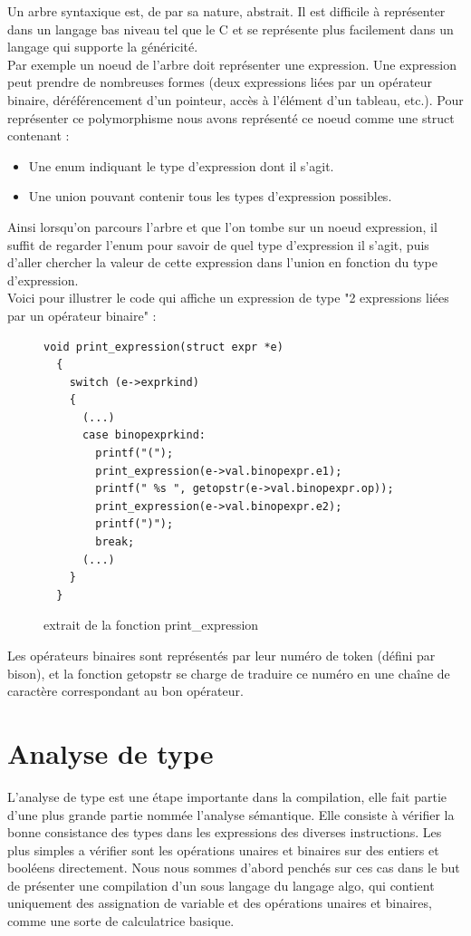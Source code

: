 \documentclass[12pt,a4paper]{report}
\begin{document}
Un arbre syntaxique est, de par sa nature, abstrait. Il est difficile à représenter dans un langage bas niveau tel que le C et se représente plus facilement dans un langage qui supporte la généricité. \\

Par exemple un noeud de l'arbre doit représenter une expression. Une expression peut prendre de nombreuses formes (deux expressions liées par un opérateur binaire, déréférencement d'un pointeur, accès à l'élément d'un tableau, etc.). Pour représenter ce polymorphisme nous avons représenté ce noeud comme une struct contenant :
\begin{itemize}
\item Une enum indiquant le type d'expression dont il s'agit.
\item Une union pouvant contenir tous les types d'expression possibles.
\end{itemize}
Ainsi lorsqu'on parcours l'arbre et que l'on tombe sur un noeud expression, il suffit de regarder l'enum pour savoir de quel type d'expression il s'agit, puis d'aller chercher la valeur de cette expression dans l'union en fonction du type d'expression. \\

Voici pour illustrer le code qui affiche un expression de type "2 expressions liées par un opérateur binaire" :


\begin{figure}[H]
  \begin{lstlisting}[style=base]
  void print_expression(struct expr *e)
  {
    switch (e->exprkind)
    {
      (...)
      case binopexprkind:
        printf("(");
        print_expression(e->val.binopexpr.e1);
        printf(" %s ", getopstr(e->val.binopexpr.op));
        print_expression(e->val.binopexpr.e2);
        printf(")");
        break;
      (...)
    }
  }
  \end{lstlisting}
  \caption{extrait de la fonction print\_expression}
  \label{print_binop}
\end{figure}

Les opérateurs binaires sont représentés par leur numéro de token (défini par bison), et la fonction getopstr se charge de traduire ce numéro en une chaîne de caractère correspondant au bon opérateur.

\newpage

\section{Analyse de type}
L'analyse de type est une étape importante dans la compilation, elle fait partie d'une plus grande partie nommée l'analyse sémantique. Elle consiste à vérifier la bonne consistance des types dans les expressions des diverses instructions. Les plus simples a vérifier sont les opérations unaires et binaires sur des entiers et booléens directement.
Nous nous sommes d'abord penchés sur ces cas dans le but de présenter une compilation d'un sous langage du langage algo, qui contient uniquement des assignation de variable et des opérations unaires et binaires, comme une sorte de calculatrice  basique.
\end{document}
